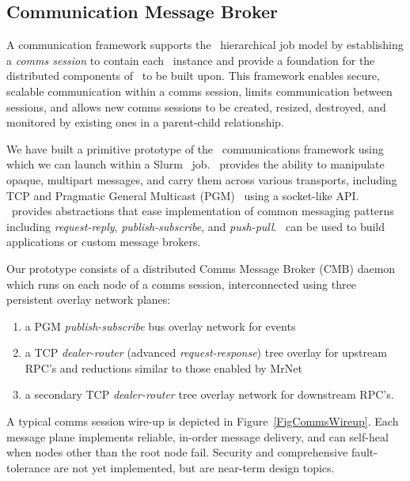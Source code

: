 \subsection{Communication Message Broker}

A communication framework supports the \flux\ hierarchical job model
by establishing a {\em comms session} to contain each \flux\ instance
and provide a foundation for the distributed components of \flux\ to
be built upon.
This framework enables secure, scalable communication
within a comms session, limits communication between sessions,
and allows new comms sessions to be created, resized, destroyed,
and monitored by existing ones in a parent-child relationship.

We have built a primitive prototype of the \flux\ communications framework
using \zMQ~\cite{ZMQGuide} which we can launch within a
Slurm~\cite{Jette02slurm} job.
\zMQ\ provides the ability to manipulate opaque,
multipart messages, and carry them across various transports, including
TCP and Pragmatic General Multicast (PGM)~\cite{rfc3208}
using a socket-like API.
\zMQ\ provides abstractions that ease implementation of common
messaging patterns including {\em request-reply}, {\em publish-subscribe},
and {\em push-pull}.
\zMQ\ can be used to build applications or custom message brokers.

Our prototype consists of a distributed Comms Message Broker (CMB)
daemon which runs on each node of a comms session, interconnected using
three persistent overlay network planes:
\begin{enumerate}
\item{a PGM {\em publish-subscribe} bus overlay network for events}
\item{a TCP {\em dealer-router} (advanced {\em request-response})
tree overlay for upstream RPC's and reductions
similar to those enabled by MrNet~\cite{mrnet}}
\item{a secondary TCP {\em dealer-router} tree overlay network for
downstream RPC's.}
\end{enumerate}
A typical comms session wire-up is depicted in Figure~\ref{FigCommsWireup}.
Each message plane implements reliable, in-order message delivery, and
can self-heal when nodes other than the root node fail.
Security and comprehensive fault-tolerance are not yet implemented,
but are near-term design topics.

